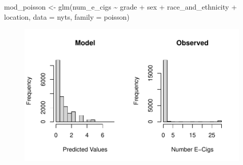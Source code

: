\documentclass[
  letterpaper,
]{krantz}
\makeatletter
\newenvironment{Shaded}{\begin{snugshade}}{\end{snugshade}}
\newcommand{\AttributeTok}[1]{\textcolor[rgb]{0.40,0.45,0.13}{#1}}
\newcommand{\DecValTok}[1]{\textcolor[rgb]{0.68,0.00,0.00}{#1}}
\newcommand{\FunctionTok}[1]{\textcolor[rgb]{0.28,0.35,0.67}{#1}}
\newcommand{\NormalTok}[1]{\textcolor[rgb]{0.00,0.23,0.31}{#1}}
\newcommand{\OtherTok}[1]{\textcolor[rgb]{0.00,0.23,0.31}{#1}}
\newcommand{\SpecialCharTok}[1]{\textcolor[rgb]{0.37,0.37,0.37}{#1}}
\newcommand{\StringTok}[1]{\textcolor[rgb]{0.13,0.47,0.30}{#1}}
\newenvironment{kframe}{%
\medskip{}
\setlength{\fboxsep}{.8em}
 \def\at@end@of@kframe{}%
 \ifinner\ifhmode%
  \def\at@end@of@kframe{\end{minipage}}%
  \begin{minipage}{\columnwidth}%
 \fi\fi%
 \def\FrameCommand##1{\hskip\@totalleftmargin \hskip-\fboxsep
 \colorbox{shadecolor}{##1}\hskip-\fboxsep
     \hskip-\linewidth \hskip-\@totalleftmargin \hskip\columnwidth}%
 \MakeFramed {\advance\hsize-\width
   \@totalleftmargin\z@ \linewidth\hsize
   \@setminipage}}%
 {\par\unskip\endMakeFramed%
 \at@end@of@kframe}
\renewenvironment{Shaded}{\begin{kframe}}{\end{kframe}}
\makeatother
\begin{document}
\begin{Shaded}
\begin{Highlighting}[]
\NormalTok{mod\_poisson }\OtherTok{\textless{}{-}} \FunctionTok{glm}\NormalTok{(num\_e\_cigs }\SpecialCharTok{\textasciitilde{}}\NormalTok{ grade }\SpecialCharTok{+}\NormalTok{ sex }\SpecialCharTok{+}\NormalTok{ race\_and\_ethnicity }\SpecialCharTok{+}\NormalTok{ location,}
                 \AttributeTok{data =}\NormalTok{ nyts, }\AttributeTok{family =}\NormalTok{ poisson)}
\end{Highlighting}
\end{Shaded}

\begin{Shaded}
\end{Shaded}

\begin{figure}[H]

{\centering \includegraphics[width=1\textwidth,height=\textheight]{book/11_logistic_regression_files/figure-pdf/unnamed-chunk-25-1.pdf}

}

\end{figure}
\end{document}
